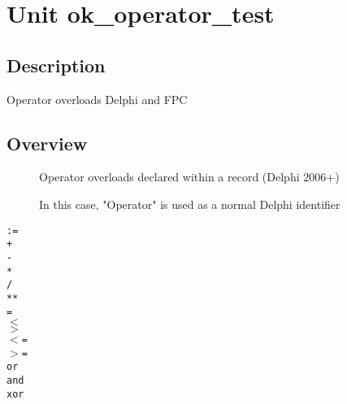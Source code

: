 \documentclass{report}
\begin{document}
\label{toc}\tableofcontents
\newpage
\newlength{\tmplength}
\chapter{Unit ok{\_}operator{\_}test}
\label{ok_operator_test}
\section{Description}
Operator overloads Delphi and FPC
\section{Overview}
\begin{description}
\item[\texttt{\begin{ttfamily}TDelphiRec\end{ttfamily} Record}]Operator overloads declared within a record (Delphi 2006+)
\item[\texttt{\begin{ttfamily}TMyClass\end{ttfamily} Class}]In this case, "Operator" is used as a normal Delphi identifier
\item[\texttt{\begin{ttfamily}TMyType\end{ttfamily} Record}]
\item[\texttt{\begin{ttfamily}TMyType2\end{ttfamily} Record}]
\end{description}
\begin{description}
\item[\texttt{:=}]
\item[\texttt{+}]
\item[\texttt{-}]
\item[\texttt{*}]
\item[\texttt{/}]
\item[\texttt{**}]
\item[\texttt{=}]
\item[\texttt{{$<$}}]
\item[\texttt{{$>$}}]
\item[\texttt{{$<$}=}]
\item[\texttt{{$>$}=}]
\item[\texttt{or}]
\item[\texttt{and}]
\item[\texttt{xor}]
\end{description}
\end{document}
